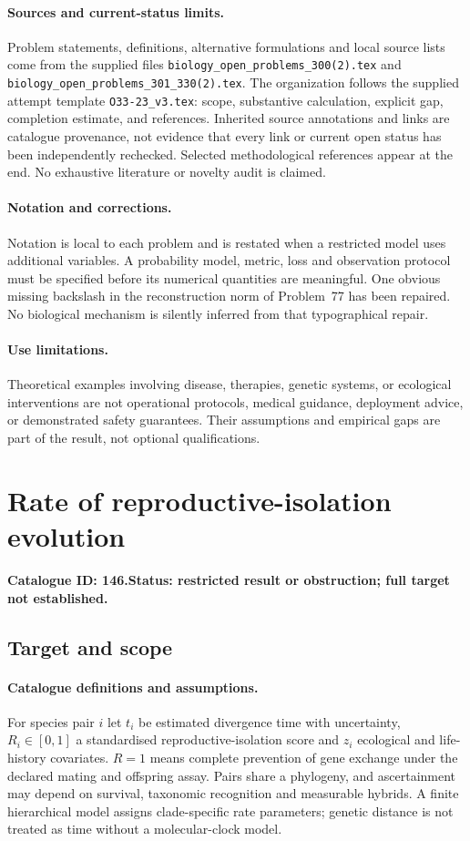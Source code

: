 \documentclass[11pt]{article}
\begin{document}
\paragraph{Sources and current-status limits.}
Problem statements, definitions, alternative formulations and local source lists
come from the supplied files
\texttt{biology\_open\_problems\_300(2).tex} and
\texttt{biology\_open\_problems\_301\_330(2).tex}.
The organization follows the supplied attempt template
\texttt{O33-23\_v3.tex}: scope, substantive calculation, explicit gap,
completion estimate, and references. Inherited source annotations and links are
catalogue provenance, not evidence that every link or current open status has
been independently rechecked. Selected methodological references appear at the
end. No exhaustive literature or novelty audit is claimed.

\paragraph{Notation and corrections.}
Notation is local to each problem and is restated when a restricted model uses
additional variables. A probability model, metric, loss and observation protocol
must be specified before its numerical quantities are meaningful. One obvious
missing backslash in the reconstruction norm of Problem~77 has been repaired.
No biological mechanism is silently inferred from that typographical repair.

\paragraph{Use limitations.}
Theoretical examples involving disease, therapies, genetic systems, or ecological
interventions are not operational protocols, medical guidance, deployment advice,
or demonstrated safety guarantees. Their assumptions and empirical gaps are part
of the result, not optional qualifications.

\setcounter{section}{145}
\section{Rate of reproductive-isolation evolution}
\label{prob:146}
\noindent\textbf{Catalogue ID: 146.}\quad \textbf{Status: restricted result or obstruction; full target not established.}
\subsection{Target and scope}
\paragraph{Catalogue definitions and assumptions.}
For species pair $i$ let $t_i$ be estimated divergence time with uncertainty, $R_i\in[0,1]$ a standardised reproductive-isolation score and $z_i$ ecological and life-history covariates. $R=1$ means complete prevention of gene exchange under the declared mating and offspring assay. Pairs share a phylogeny, and ascertainment may depend on survival, taxonomic recognition and measurable hybrids. A finite hierarchical model assigns clade-specific rate parameters; genetic distance is not treated as time without a molecular-clock model.
\end{document}
